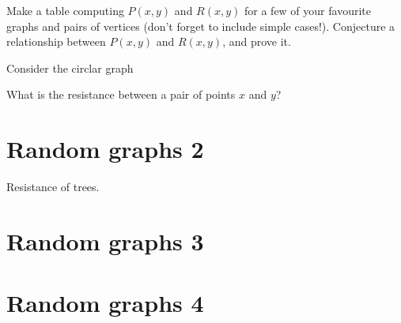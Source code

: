 \documentclass[11pt,fleqn]{book} %
\begin{document}
\begin{problem}
Make a table computing $P(x,y)$ and $R(x,y)$ for a few of your favourite graphs and pairs of vertices (don't forget to include simple cases!). Conjecture a relationship between $P(x,y)$ and $R(x,y)$, and prove it.
\end{problem}


\begin{problem}
  Consider the circlar graph 
  \begin{center}
   \end{center} 
   What is the resistance between a pair of points $x$ and $y$?
\end{problem}























\newpage 
 \chapter{Random graphs 2}


\begin{problem}
  Resistance of trees. 
\end{problem}











\newpage 
    \chapter{Random graphs 3}
\kapiteldatum{}


\newpage 
    \chapter{Random graphs 4}
\kapiteldatum{}
\end{document}
